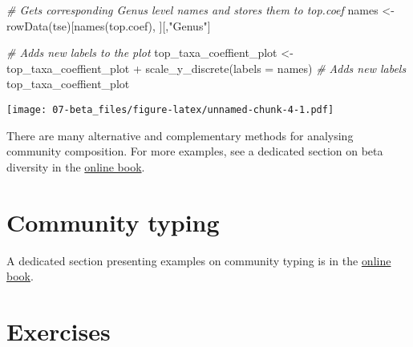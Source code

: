 \documentclass[
  oneside]{book}
\newenvironment{Shaded}{\begin{snugshade}}{\end{snugshade}}
\newcommand{\AttributeTok}[1]{\textcolor[rgb]{0.77,0.63,0.00}{#1}}
\newcommand{\CommentTok}[1]{\textcolor[rgb]{0.56,0.35,0.01}{\textit{#1}}}
\newcommand{\FunctionTok}[1]{\textcolor[rgb]{0.00,0.00,0.00}{#1}}
\newcommand{\NormalTok}[1]{#1}
\newcommand{\OtherTok}[1]{\textcolor[rgb]{0.56,0.35,0.01}{#1}}
\newcommand{\SpecialCharTok}[1]{\textcolor[rgb]{0.00,0.00,0.00}{#1}}
\newcommand{\StringTok}[1]{\textcolor[rgb]{0.31,0.60,0.02}{#1}}
\begin{document}
\begin{Shaded}
\begin{Highlighting}[]
\CommentTok{\# Gets corresponding Genus level names and stores them to top.coef}
\NormalTok{names }\OtherTok{\textless{}{-}} \FunctionTok{rowData}\NormalTok{(tse)[}\FunctionTok{names}\NormalTok{(top.coef), ][,}\StringTok{"Genus"}\NormalTok{]}

\CommentTok{\# Adds new labels to the plot}
\NormalTok{top\_taxa\_coeffient\_plot }\OtherTok{\textless{}{-}}\NormalTok{ top\_taxa\_coeffient\_plot }\SpecialCharTok{+}
  \FunctionTok{scale\_y\_discrete}\NormalTok{(}\AttributeTok{labels =}\NormalTok{ names) }\CommentTok{\# Adds new labels}
\NormalTok{top\_taxa\_coeffient\_plot}
\end{Highlighting}
\end{Shaded}

\texttt{[image: 07-beta\_files/figure-latex/unnamed-chunk-4-1.pdf]}

There are many alternative and complementary methods for analysing
community composition. For more examples, see a dedicated section on
beta diversity in the \href{https://microbiome.github.io/OMA/microbiome-diversity.html\#beta-diversity}{online
book}.

\hypertarget{community-typing}{%
\section{Community typing}\label{community-typing}}

A dedicated section presenting examples on community typing is in the
\href{https://microbiome.github.io/OMA/microbiome-community.html\#community-typing}{online book}.

\hypertarget{exercises-1}{%
\section{Exercises}\label{exercises-1}}
\end{document}
